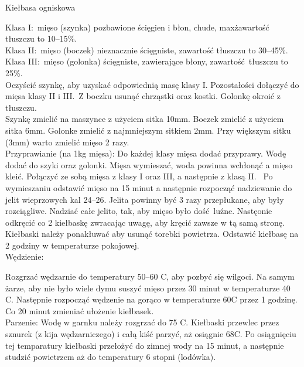 \documentclass[a4paper,12pt]{article}
\begin{document}
\begin{recipe}{Kiełbasa ogniskowa}{}{}


\freeform%
Klasa I:\ mięso (szynka) pozbawione ścięgien i błon, chude, max\. zawartość tłuszczu to 10--15\%. \\
Klasa II:\ mięso (boczek) nieznacznie ścięgniste, zawartość tłuszczu to 30--45\%. \\
Klasa III:\ mięso (golonka) ścięgniste, zawierające błony, zawartość tłuszczu to 25\%.\\

Oczyścić szynkę, aby uzyskać odpowiednią masę klasy I. Pozostałości dołączyć do mięsa klasy II i III.\
Z boczku usunąć chrząstki oraz kostki. Golonkę okroić z tłuszczu.\\
Szynkę zmielić na maszynce z użyciem sitka 10mm. 
Boczek zmielić z użyciem sitka 6mm.
Golonke zmielić z najmniejszym sitkiem 2mm. Przy większym sitku (3mm) warto zmielić mięso 2 razy. \\

Przyprawianie (na 1kg mięsa):
Do każdej klasy mięsa dodać przyprawy.
Wodę dodać do szyki oraz golonki. 
Mięsa wymieszać, woda powinna wchłonąć a mięso kleić.
Połączyć ze sobą mięsa z klasy I oraz III, a następnie z klasą II.\
\freeform%
Po wymieszaniu odstawić mięso na 15 minut a następnie rozpocząć nadziewanie do jelit wieprzowych kal 24--26.
Jelita powinny być 3 razy przepłukane, aby były rozciągliwe. Nadziać całe jelito, tak, aby mięso było dość luźne.
Nastęonie odkręcić co 2 kiełbaskę zwracając uwagę, aby kręcić zawsze w tą samą stronę.
Kiełbaski należy ponakłuwać aby usunąć torebki powietrza.
Odstawić kiełbasę na 2 godziny w temperaturze pokojowej.\\

Wędzienie:

Rozgrzać wędzarnie do temperatury 50--60 \0C, aby pozbyć się wilgoci.
Na samym żarze, aby nie było wiele dymu suszyć mięso przez 30 minut w temperaturze 40 \0C.
Następnie rozpocząć wędzenie na gorąco w temperaturze 60\0C przez 1 godzinę.
Co 20 minut zmieniać ułożenie kiełbasek. \\

Parzenie:
Wodę w garnku należy rozgrzać do 75 \0C. Kiełbaski przewlec przez sznurek (z kija wędzarniczego) i całą kiść parzyć, aż osiągnie 68\0C. 
Po osiągnięciu tej temparatury kiełbaski przełożyć do zimnej wody na 15 minut, a następnie studzić powietrzem aż do temperatury 6 stopni (lodówka).


\end{recipe}
\end{document}
